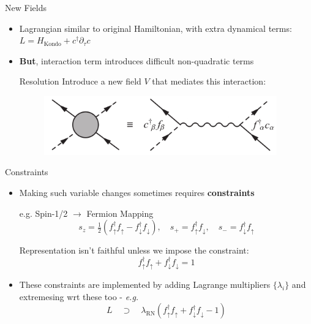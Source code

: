 \documentclass[13pt]{beamer}
\begin{document}
  \begin{frame}{New Fields}

  \begin{itemize}
    \item Lagrangian similar to original Hamiltonian, with extra dynamical terms: $ L = H_{\text{Kondo}} + c^\dagger \partial_\tau c$
    \item \textbf{But}, interaction term introduces difficult non-quadratic terms

    \begin{alertblock}{Resolution} %
      Introduce a new field $ V $ that mediates this interaction:
      \begin{figure}
        \centering
        \includegraphics[width=0.95\textwidth]{Figures/V_field.png}
      \end{figure}
    \end{alertblock}
  \end{itemize}

  \end{frame}

  \begin{frame}{Constraints}

  \begin{itemize}
    \item Making such variable changes sometimes requires \textbf{constraints}
  

  \begin{exampleblock}{e.g. Spin-1/2 $ \rightarrow $ Fermion Mapping}
  $$ s_z = \tfrac{1}{2} (f^{\dagger}_{\uparrow} f^{}_{\uparrow} - f^{\dagger}_{\downarrow} f^{}_{\downarrow}), \quad s_{+} = f^{\dagger}_{\uparrow} f^{}_{\downarrow}, \quad s_{-} = f^{\dagger}_{\downarrow} f^{}_{\uparrow} $$

  Representation isn't faithful unless we impose the constraint: $$ f^{\dagger}_{\uparrow} f^{}_{\uparrow} + f^{\dagger}_{\downarrow} f^{}_{\downarrow} = 1 $$
  \end{exampleblock}

    \item These constraints are implemented by adding Lagrange multipliers $ \{ \lambda_i \}$ and extremesing wrt these too - \textit{e.g.} $$ L \quad \supset \quad \lambda_{\text{RN}} (f^{\dagger}_{\uparrow} f^{}_{\uparrow} + f^{\dagger}_{\downarrow} f^{}_{\downarrow} - 1) $$

  \end{itemize}
  \end{frame}
\end{document}
